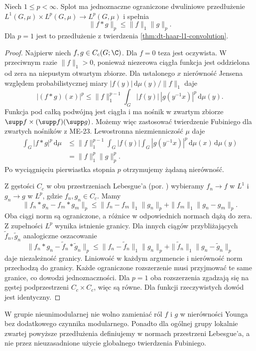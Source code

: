 \begin{twierdzenie}
\label{thm:dt-haar-young}
Niech $1\le p<\infty$. Splot ma jednoznaczne
ograniczone dwuliniowe przedłużenie
$L^1(G,\mu)\times L^p(G,\mu)\to L^p(G,\mu)$
i spełnia
\[
 \|f*g\|_p\le \|f\|_1\|g\|_p.
\]
Dla $p=1$ jest to przedłużenie z twierdzenia
\ref{thm:dt-haar-l1-convolution}.
\end{twierdzenie}
\begin{proof}
Najpierw niech $f,g\in C_c(G;\C)$.
Dla $f=0$ teza jest oczywista. W przeciwnym razie
$\|f\|_1>0$, ponieważ niezerowa ciągła funkcja
jest oddzielona od zera na niepustym otwartym zbiorze.
Dla ustalonego $x$ nierówność Jensena względem
probabilistycznej miary $|f(y)|\,\mathrm d\mu(y)/\|f\|_1$
daje
\[
 |(f*g)(x)|^p
 \le \|f\|_1^{p-1}
 \int_G |f(y)|\,|g(y^{-1}x)|^p\,\mathrm d\mu(y).
\]
Funkcja pod całką podwójną jest ciągła i ma nośnik
w zwartym zbiorze
$\supp f\times(\supp f)(\supp g)$.
Możemy więc zastosować twierdzenie Fubiniego
dla zwartych nośników z ME-23.
Lewostronna niezmienniczość $\mu$ daje
\[
 \begin{aligned}
 \int_G |f*g|^p\,\mathrm d\mu
 &\le \|f\|_1^{p-1}\int_G|f(y)|
       \int_G |g(y^{-1}x)|^p\,\mathrm d\mu(x)
       \,\mathrm d\mu(y)\\
 &=\|f\|_1^p\|g\|_p^p.
 \end{aligned}
\]
Po wyciągnięciu pierwiastka stopnia $p$ otrzymujemy
żądaną nierówność.

Z gęstości $C_c$ w obu przestrzeniach Lebesgue'a
(por. )
wybieramy $f_n\to f$ w $L^1$ i $g_n\to g$ w $L^p$,
gdzie $f_n,g_n\in C_c$. Mamy
\[
 \|f_n*g_n-f_m*g_m\|_p
 \le\|f_n-f_m\|_1\|g_n\|_p+
 \|f_m\|_1\|g_n-g_m\|_p.
\]
Oba ciągi norm są ograniczone, a różnice w odpowiednich
normach dążą do zera. Z zupełności $L^p$ wynika istnienie
granicy. Dla innych ciągów przybliżających
$\widetilde f_n,\widetilde g_n$ analogiczne oszacowanie
\[
 \|f_n*g_n-\widetilde f_n*\widetilde g_n\|_p
 \le\|f_n-\widetilde f_n\|_1\|g_n\|_p+
 \|\widetilde f_n\|_1\|g_n-\widetilde g_n\|_p
\]
daje niezależność granicy. Liniowość w każdym
argumencie i nierówność norm przechodzą do granicy.
Każde ograniczone rozszerzenie musi przyjmować te
same granice, co dowodzi jednoznaczności.
Dla $p=1$ oba rozszerzenia zgadzają się na gęstej
podprzestrzeni $C_c\times C_c$, więc są równe.
Dla funkcji rzeczywistych dowód jest identyczny.
\end{proof}

\begin{uwaga}
W grupie nieunimodularnej nie wolno zamieniać ról
$f$ i $g$ w nierówności Younga bez dodatkowego
czynnika modularnego. Ponadto dla ogólnej grupy
lokalnie zwartej powyższe przedłużenia definiujemy
w normach przestrzeni Lebesgue'a, a nie przez
nieuzasadnione użycie globalnego twierdzenia Fubiniego.
\end{uwaga}
